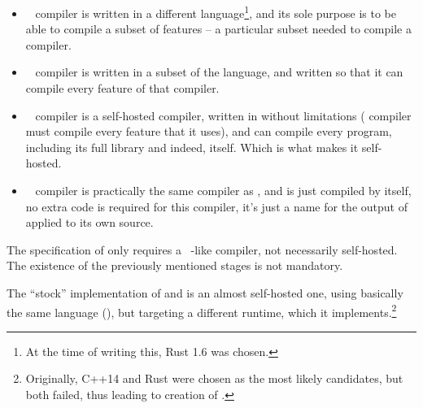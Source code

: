 \begin{itemize}
  \item {}~ \AmlSystem compiler is written in a different language\footnote{At the time of writing this, Rust 1.6 was chosen.}, and its sole purpose is to be able to compile a subset of \AmlSystem features -- a particular subset needed to compile a  compiler. 
  \item {}~ \AmlSystem compiler is written in a subset of the \AmlSystem language, and written so that it can compile every feature of \AmlSystem that  compiler. 
  \item {}~ \AmlSystem compiler is a self-hosted compiler, written in \AmlSystem without limitations ( compiler must compile every feature that it uses), and can compile every \AmlSystem program, including its full library and indeed, itself. Which is what makes it self-hosted. 
  \item {}~ \AmlSystem compiler is practically the same compiler as , and is just compiled by itself, no extra code is required for this compiler, it's just a name for the output of  applied to its own source. 
\end{itemize}

The specification of \AmlSystem only requires a ~-like compiler, not necessarily self-hosted. The existence of the previously mentioned stages is not mandatory. 

The ``stock'' implementation of \Aml and \AmlS is an almost self-hosted one, using basically the same language (\AmlSystem), but targeting a different runtime, which it implements.\footnote{Originally, C++14 and Rust were chosen as the most likely candidates, but both failed, thus leading to creation of \AmlSystem.}






